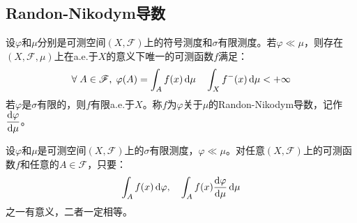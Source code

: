 \subsection{Randon-Nikodym导数}
\begin{theorem}\label{theo:RandonNikodym}
	设$\varphi$和$\mu$分别是可测空间$(X,\mathscr{F})$上的符号测度和$\sigma$有限测度。若$\varphi\ll\mu$，则存在$(X,\mathscr{F},\mu)$上在a.e.于$X$的意义下唯一的可测函数$f$满足：
	\begin{equation*}
		\forall\;A\in\mathscr{F},\;\varphi(A)=\int_{A}f(x)\mathop{}\!\mathrm{d}\mu\quad\int_{X}f^-(x)\mathop{}\!\mathrm{d}\mu<+\infty
	\end{equation*}
	若$\varphi$是$\sigma$有限的，则$f$有限a.e.于$X$。称$f$为$\varphi$关于$\mu$的Randon-Nikodym导数，记作$\dfrac{\mathop{}\!\mathrm{d}\varphi}{\mathop{}\!\mathrm{d}\mu}$。
\end{theorem}
\begin{lemma}\label{lem:IntChangeOfMeasure}
	设$\varphi$和$\mu$是可测空间$(X,\mathscr{F})$上的$\sigma$有限测度，$\varphi\ll\mu$。对任意$(X,\mathscr{F})$上的可测函数$f$和任意的$A\in\mathscr{F}$，只要：
	\begin{equation*}
		\int_{A}f(x)\mathop{}\!\mathrm{d}\varphi,\quad\int_{A}f(x)\frac{\mathop{}\!\mathrm{d}\varphi}{\mathop{}\!\mathrm{d}\mu}\mathop{}\!\mathrm{d}\mu
	\end{equation*}
	之一有意义，二者一定相等。
\end{lemma}
